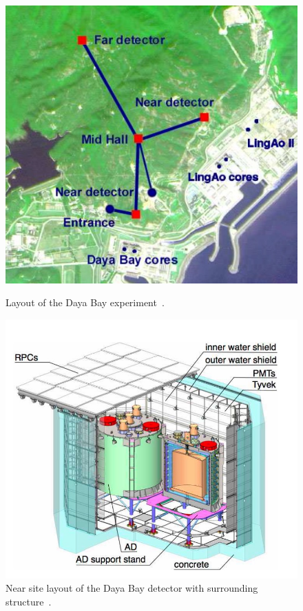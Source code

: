 \begin{figure}[h!]
  \centering
  \begin{minipage}[b]{0.49\textwidth}
    \includegraphics[width=\textwidth]{figures/DayaBay.jpeg}
    \vspace{2mm}
    \caption{Layout of the Daya Bay experiment~\cite{44DayaBay}.}
    \label{fig:DB}
  \end{minipage}
  \hfill
  \begin{minipage}[b]{0.49\textwidth}
    \includegraphics[width=\textwidth]{figures/db2.jpeg}
       \vspace{2mm}
    \caption{Near site layout of the Daya Bay detector with surrounding structure~\cite{74DayaBay}.}
     \label{fig:db2}
  \end{minipage}
\end{figure}

